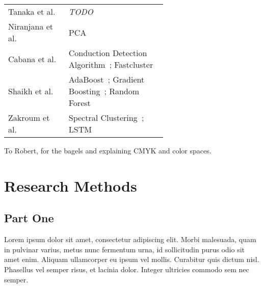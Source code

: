 \documentclass[manuscript,nonacm]{acmart}
\begin{document}
\begin{table}[]
\begin{tabular}{lp{0.62\linewidth}}
        Tanaka et al.~\cite{2023tanaka,2021tanaka}             & \textit{TODO} \\
        Niranjana et al.~\cite{2019niranjana}                  & PCA~\cite{1901pearson,1993hotelling} \\
        Cabana et al.~\cite{2019cabana}                        & Conduction Detection Algorithm~\cite{2015lu}; Fastcluster~\cite{2013mullner} \\
        Shaikh et al.~\cite{2018shaikh}                        & AdaBoost~\cite{@@}; Gradient Boosting~\cite{@@}; Random Forest~\cite{@@} \\
        Zakroum et al.~\cite{2022zakroum,2018zakroum}          & Spectral Clustering~\cite{2001ng}; LSTM~\cite{1997hochreiter} \\
        \bottomrule
    \end{tabular}
\end{table}


\begin{acks}
To Robert, for the bagels and explaining CMYK and color spaces.
\end{acks}




\appendix
\section{Research Methods}

\subsection{Part One}

Lorem ipsum dolor sit amet, consectetur adipiscing elit. Morbi
malesuada, quam in pulvinar varius, metus nunc fermentum urna, id
sollicitudin purus odio sit amet enim. Aliquam ullamcorper eu ipsum
vel mollis. Curabitur quis dictum nisl. Phasellus vel semper risus, et
lacinia dolor. Integer ultricies commodo sem nec semper.
\end{document}
